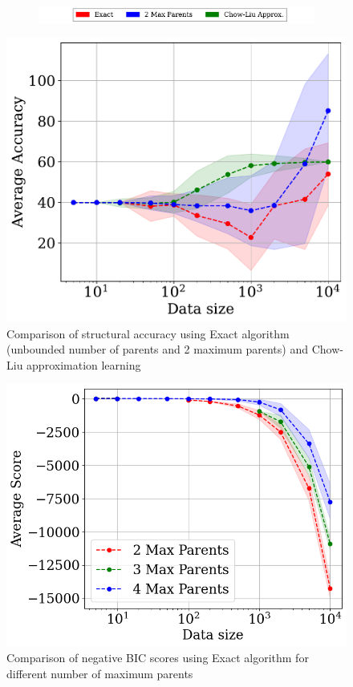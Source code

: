 \begin{figure}[htp!]
\begin{subfigure}{0.7\textwidth}
         \centering
    \includegraphics[width=\textwidth]{plots/legends.pdf}
     \end{subfigure}
    \centering
    \includegraphics[width=0.5\linewidth]{plots/accuracy.pdf}
    \caption{Comparison of structural accuracy using Exact algorithm (unbounded number of parents and 2 maximum parents) and Chow-Liu approximation learning}
    \label{fig:str_acc}
\end{figure}

\begin{figure}[htp!]
    \centering
\includegraphics[width=0.5\linewidth]{plots/scores.png}
    \caption{Comparison of negative BIC scores using Exact algorithm for different number of maximum parents}
    \label{fig:bic}
\end{figure}